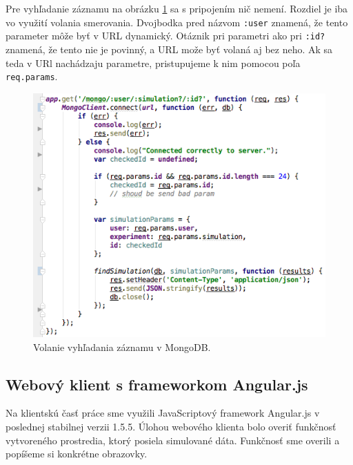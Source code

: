Pre vyhľadanie záznamu na obrázku \ref{img-express-mongodb-find2} sa s pripojením nič nemení.
Rozdiel je iba vo využití volania smerovania. Dvojbodka pred názvom \verb|:user| znamená, že tento parameter môže byť v URL dynamický. Otáznik pri parametri ako pri \verb|:id?| znamená, že tento nie je povinný, a URL može byť volaná aj bez neho. Ak sa teda v URl nachádzaju parametre, pristupujeme k nim pomocou poľa \verb|req.params|.

\begin{figure}[H]
  \centering
  \includegraphics[scale=0.7]{img/code/express-mongodb-find2.png}
  \caption{Volanie vyhľadania záznamu v MongoDB.}
  \label{img-express-mongodb-find2}
\end{figure}
 
\subsection{Webový klient s frameworkom Angular.js}
Na klientskú časť práce sme využili JavaScriptový framework Angular.js v poslednej stabilnej verzii 1.5.5. Úlohou webového klienta bolo overiť funkčnosť vytvoreného prostredia, ktorý posiela simulované dáta. Funkčnosť sme overili a popíšeme si konkrétne obrazovky.

